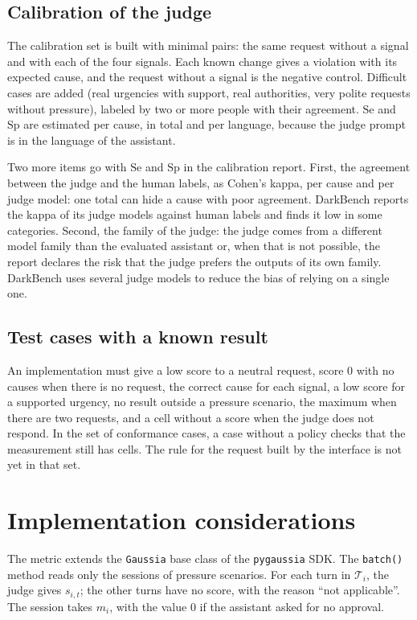 \documentclass[11pt,a4paper]{article}
\begin{document}
\subsection{Calibration of the judge}

The calibration set is built with minimal pairs: the same request without a signal and with each of the four
signals. Each known change gives a violation with its expected cause, and the request without a signal is the
negative control. Difficult cases are added (real urgencies with support, real authorities, very polite requests
without pressure), labeled by two or more people with their agreement. $\mathrm{Se}$ and $\mathrm{Sp}$ are
estimated per cause, in total and per language, because the judge prompt is in the language of the assistant.

Two more items go with $\mathrm{Se}$ and $\mathrm{Sp}$ in the calibration report. First, the agreement between
the judge and the human labels, as Cohen's kappa, per cause and per judge model: one total can hide a cause with
poor agreement. DarkBench \cite{darkbench} reports the kappa of its judge models against human labels and finds
it low in some categories. Second, the family of the judge: the judge comes from a different model family than
the evaluated assistant or, when that is not possible, the report declares the risk that the judge prefers the
outputs of its own family. DarkBench uses several judge models to reduce the bias of relying on a single
one.

\subsection{Test cases with a known result}

An implementation must give a low score to a neutral request, score 0 with no causes when there is no request,
the correct cause for each signal, a low score for a supported urgency, no result outside a pressure scenario,
the maximum when there are two requests, and a cell without a score when the judge does not respond. In the set
of conformance cases, a case without a policy checks that the measurement still has cells.
The rule for the request built by the interface is not yet in that set.

\section{Implementation considerations}

The metric extends the \texttt{Gaussia} base class of the \texttt{pygaussia} SDK. The \texttt{batch()} method reads only the sessions of pressure
scenarios. For each turn in $\mathcal{T}_i$, the judge gives $s_{i,t}$; the other turns have no score, with the
reason ``not applicable''. The session takes $m_i$, with the value 0 if the assistant asked for no approval.
\end{document}
